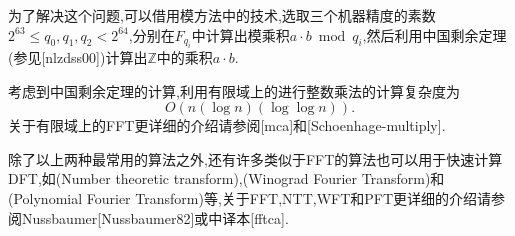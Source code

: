 \documentclass{ctexart}
\newcommand\mtcasCite[1]{[#1]}
\theoremstyle{remark}
\theoremstyle{definition}
\begin{document}
为了解决这个问题,可以借用模方法中的技术,选取三个机器精度的素数$2^{63}\le q_0,q_1,q_2<2^{64}$,分别在$F_{q_i}$中计算出模乘积$a\cdot b\bmod q_i$,然后利用中国剩余定理(参见\mtcasCite{nlzdss00})计算出$\mathbb{Z}$中的乘积$a\cdot b$.

考虑到中国剩余定理的计算,利用有限域上的进行整数乘法的计算复杂度为$$O(n(\log{n})(\log{\log{n}})).$$关于有限域上的FFT更详细的介绍请参阅\mtcasCite{mca}和\mtcasCite{Schoenhage-multiply}.

除了以上两种最常用的算法之外,还有许多类似于FFT的算法也可以用于快速计算DFT,如(Number theoretic transform),(Winograd Fourier Transform)和(Polynomial Fourier Transform)等,关于FFT,NTT,WFT和PFT更详细的介绍请参阅Nussbaumer\mtcasCite{Nussbaumer82}或中译本\mtcasCite{fftca}.


\printindex
\end{document}
